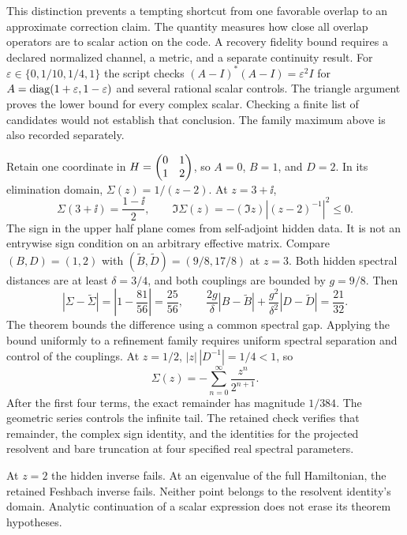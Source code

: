 This distinction prevents a tempting shortcut from one favorable overlap to an approximate correction claim. The quantity measures how close all overlap operators are to scalar action on the code. A recovery fidelity bound requires a declared normalized channel, a metric, and a separate continuity result.
For $\varepsilon\in\{0,1/10,1/4,1\}$ the script checks $(A-I)^*(A-I)=\varepsilon^2I$ for $A=\operatorname{diag}(1+\varepsilon,1-\varepsilon)$ and several rational scalar controls. The triangle argument proves the lower bound for every complex scalar. Checking a finite list of candidates would not establish that conclusion. The family maximum above is also recorded separately.

Retain one coordinate in $H=\begin{pmatrix}0&1\\1&2\end{pmatrix}$, so $A=0$, $B=1$, and $D=2$. In its elimination domain, $\Sigma(z)=1/(z-2)$. At $z=3+\ii$,
\[
\Sigma(3+\ii)=\frac{1-\ii}{2},\qquad
\Im\Sigma(z)=-(\Im z)\left|(z-2)^{-1}\right|^2\leq0.
\]
The sign in the upper half plane comes from self-adjoint hidden data. It is not an entrywise sign condition on an arbitrary effective matrix.
Compare $(B,D)=(1,2)$ with $(\widetilde B,\widetilde D)=(9/8,17/8)$ at $z=3$. Both hidden spectral distances are at least $\delta=3/4$, and both couplings are bounded by $g=9/8$. Then
\[
|\Sigma-\widetilde\Sigma|=\left|1-\frac{81}{56}\right|=\frac{25}{56},
\qquad
\frac{2g}{\delta}|B-\widetilde B|
+\frac{g^2}{\delta^2}|D-\widetilde D|=\frac{21}{32}.
\]
The theorem bounds the difference using a common spectral gap. Applying the bound uniformly to a refinement family requires uniform spectral separation and control of the couplings.
At $z=1/2$, $|z|\,|D^{-1}|=1/4<1$, so
\[
\Sigma(z)=-\sum_{n=0}^{\infty}\frac{z^n}{2^{n+1}}.
\]
After the first four terms, the exact remainder has magnitude $1/384$. The geometric series controls the infinite tail. The retained check verifies that remainder, the complex sign identity, and the identities for the projected resolvent and bare truncation at four specified real spectral parameters.

At $z=2$ the hidden inverse fails. At an eigenvalue of the full Hamiltonian, the retained Feshbach inverse fails. Neither point belongs to the resolvent identity's domain. Analytic continuation of a scalar expression does not erase its theorem hypotheses.

